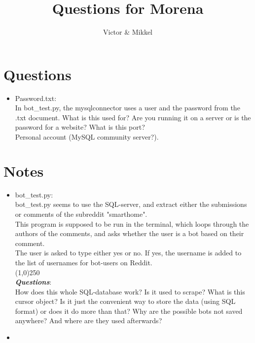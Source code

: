 \documentclass{article}
\begin{document}
\title{Questions for Morena}
\author{Victor \& Mikkel}

\maketitle

\section{Questions}
\begin{itemize}
	\item Password.txt: \\
    In bot\_test.py, the mysqlconnector uses a user and the password from the .txt document.
    What is this used for?
    Are you running it on a server or is the password for a website?
    What is this port? \\
    Personal account (MySQL community server?).
\end{itemize}

\section{Notes}
\begin{itemize}
    \item bot\_test.py:\\
    bot\_test.py seems to use the SQL-server, and extract either the submissions or comments of the subreddit "smarthome". \\
    This program is supposed to be run in the terminal, which loops through the authors of the comments, and asks whether the user is a bot based on their comment. \\
    The user is asked to type either yes or no. If yes, the username is added to the list of usernames for bot-users on Reddit. \\
    \line(1,0){250}\\
    \textbf{\emph{Questions}}:\\
    How does this whole SQL-database work? Is it used to scrape? What is this cursor object? Is it just the convenient way to store the data (using SQL format) or does it do more than that?
    Why are the possible bots not saved anywhere? And where are they used afterwards?
    \item 
\end{itemize}
\end{document}
